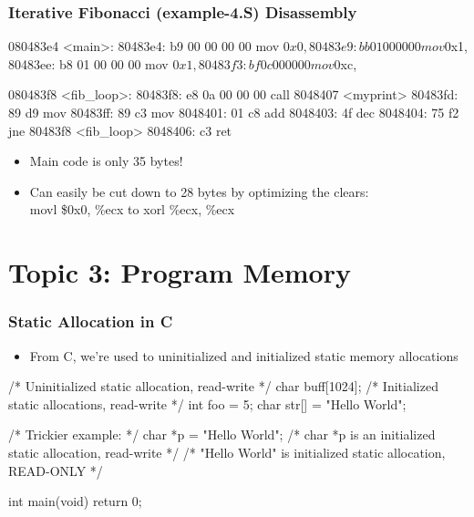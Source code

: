 \documentclass[11pt,xcolor=dvipsnames]{beamer}
\newcommand{\vs}{\vspace{0.5em}}
\begin{document}
\begin{frame}[fragile,t]
\frametitle{Iterative Fibonacci (example-4.S) Disassembly}
\begin{customobjdumpcode}
080483e4 <main>:
 80483e4: b9 00 00 00 00        mov    $0x0,%
 80483e9: bb 01 00 00 00        mov    $0x1,%
 80483ee: b8 01 00 00 00        mov    $0x1,%
 80483f3: bf 0c 00 00 00        mov    $0xc,%

080483f8 <fib_loop>:
 80483f8: e8 0a 00 00 00        call   8048407 <myprint>
 80483fd: 89 d9                 mov    %
 80483ff: 89 c3                 mov    %
 8048401: 01 c8                 add    %
 8048403: 4f                    dec    %
 8048404: 75 f2                 jne    80483f8 <fib_loop>
 8048406: c3                    ret
\end{customobjdumpcode}
\begin{itemize}
  \item Main code is only 35 bytes!
  \item Can easily be cut down to 28 bytes by optimizing the clears: \\
  {\ttfamily movl \$0x0, \%ecx} \; to \; {\ttfamily xorl \%ecx, \%ecx}
\end{itemize}
\end{frame}

\section{Topic 3: Program Memory}

\begin{frame}[fragile,t]
\frametitle{Static Allocation in C}
\begin{itemize}
  \item From C, we're used to uninitialized and initialized static memory allocations
\end{itemize}
\vs
\begin{ccode}
/* Uninitialized static allocation, read-write */
char buff[1024];
/* Initialized static allocations, read-write */
int foo = 5;
char str[] = "Hello World";

/* Trickier example: */
char *p = "Hello World";
/* char *p is an initialized static allocation, read-write */
/* "Hello World" is initialized static allocation, READ-ONLY */

int main(void) {
  return 0;
}
\end{ccode}
\end{frame}
\end{document}
